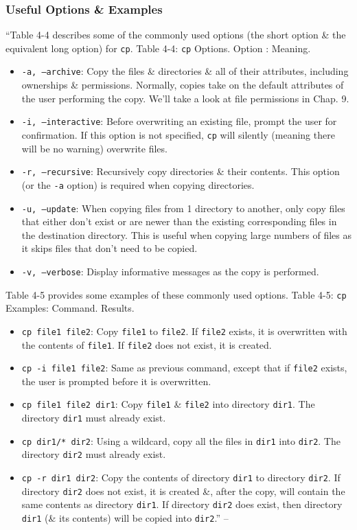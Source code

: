 \documentclass[oneside]{book}
\numberwithin{equation}{section}
\begin{document}
\subsubsection{Useful Options \& Examples}
``Table 4-4 describes some of the commonly used options (the short option \& the equivalent long option) for \texttt{cp}. \textsf{Table 4-4: \texttt{cp} Options. Option : Meaning.}
\begin{itemize}
	\item \texttt{-a, --archive}: Copy the files \& directories \& all of their attributes, including ownerships \& permissions. Normally, copies take on the default attributes of the user performing the copy. We'll take a look at file permissions in Chap. 9.
	\item \texttt{-i, --interactive}: Before overwriting an existing file, prompt the user for confirmation. If this option is not specified, \texttt{cp} will silently (meaning there will be no warning) overwrite files.
	\item \texttt{-r, --recursive}: Recursively copy directories \& their contents. This option (or the \texttt{-a} option) is required when copying directories.
	\item \texttt{-u, --update}: When copying files from 1 directory to another, only copy files that either don't exist or are newer than the existing corresponding files in the destination directory. This is useful when copying large numbers of files as it skips files that don't need to be copied.
	\item \texttt{-v, --verbose}: Display informative messages as the copy is performed.
\end{itemize}
Table 4-5 provides some examples of these commonly used options. \textsf{Table 4-5: \texttt{cp} Examples: Command. Results.}
\begin{itemize}
	\item \texttt{cp file1 file2}: Copy \texttt{file1} to \texttt{file2}. If \texttt{file2} exists, it is overwritten with the contents of \texttt{file1}. If \texttt{file2} does not exist, it is created.
	\item \texttt{cp -i file1 file2}: Same  as previous command, except that if \texttt{file2} exists, the user is prompted before it is overwritten.
	\item \texttt{cp file1 file2 dir1}: Copy \texttt{file1} \& \texttt{file2} into directory \texttt{dir1}. The directory \texttt{dir1} must already exist.
	\item \texttt{cp dir1/* dir2}: Using a wildcard, copy all the files in \texttt{dir1} into \texttt{dir2}. The directory \texttt{dir2} must already exist.
	\item \texttt{cp -r dir1 dir2}: Copy the contents of directory \texttt{dir1} to directory \texttt{dir2}. If directory \texttt{dir2} does not exist, it is created \&, after the copy, will contain the same contents as directory \texttt{dir1}. If directory \texttt{dir2} does exist, then directory \texttt{dir1} (\& its contents) will be copied into \texttt{dir2}.'' -- \cite[pp. 68--70]{Shotts2019}
\end{itemize}
\end{document}

